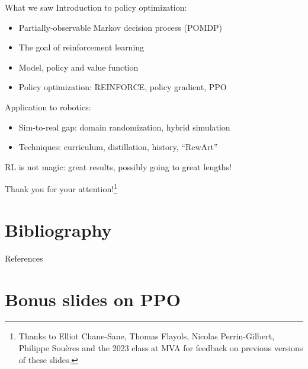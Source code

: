 \documentclass[10pt, aspectratio=1610]{beamer}
\begin{document}
\begin{frame}{What we saw}
    Introduction to policy optimization:
    \begin{itemize}
        \item Partially-observable Markov decision process (POMDP)
        \item The goal of reinforcement learning
        \item Model, policy and value function
        \item Policy optimization: REINFORCE, policy gradient, PPO
    \end{itemize}
    Application to robotics:
    \begin{itemize}
        \item Sim-to-real gap: domain randomization, hybrid simulation
        \item Techniques: curriculum, distillation, history, ``RewArt''
    \end{itemize}
    RL is not magic: great results, possibly going to great lengths!
\end{frame}

\begin{frame}[standout]
    Thank you for your attention!\footnote{\color{white} Thanks to Elliot Chane-Sane, Thomas Flayols, Nicolas Perrin-Gilbert, Philippe Sou\`{e}res and the 2023 class at MVA for feedback on previous versions of these slides.}
\end{frame}

\section*{Bibliography}

\renewcommand*{\bibfont}{\footnotesize}
\begin{frame}[allowframebreaks]{References}
    \printbibliography[heading=none]
\end{frame}

\section{Bonus slides on PPO}

\end{document}
